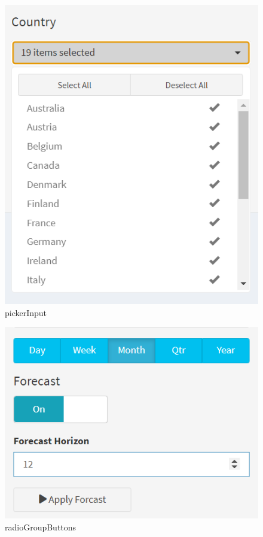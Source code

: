 \documentclass[
  11pt,
]{article}
\begin{document}
\begin{figure}

{\centering \includegraphics{img/page3.png}

}

\caption{pickerInput}

\end{figure}

\begin{figure}

{\centering \includegraphics{img/page4.png}

}

\caption{radioGroupButtons}

\end{figure}
\end{document}
